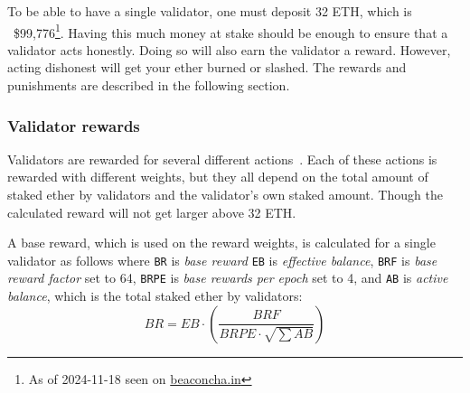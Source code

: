 To be able to have a single validator, one must deposit 32 ETH,
which is ~\$99,776\footnote{As of 2024-11-18 seen on \href{https://beaconcha.in/}{beaconcha.in}}.
Having this much money at stake should be enough to ensure that a validator acts honestly.
Doing so will also earn the validator a reward.
However, acting dishonest will get your ether burned or slashed.
The rewards and punishments are described in the following section.
\subsubsection{Validator rewards}\label{subsubsec:valrewards}
Validators are rewarded for several different actions~\cite{PoSRewAndPen}.
Each of these actions is rewarded with different weights,
but they all depend on the total amount of staked ether by validators and the validator's own staked amount.
Though the calculated reward will not get larger above 32 ETH\@.

A base reward, which is used on the reward weights, is calculated for a single validator as follows where \texttt{BR} is \textit{base reward} \texttt{EB} is \textit{effective balance}, \texttt{BRF} is \textit{base reward factor} set to 64,
\texttt{BRPE} is \textit{base rewards per epoch} set to 4,
and \texttt{AB} is \textit{active balance}, which is the total staked ether by validators:
\begin{equation}
    BR = EB\cdot(\frac{BRF}{BRPE\cdot \sqrt{\sum{AB}}})
    \label{eq:basereward}
\end{equation}


